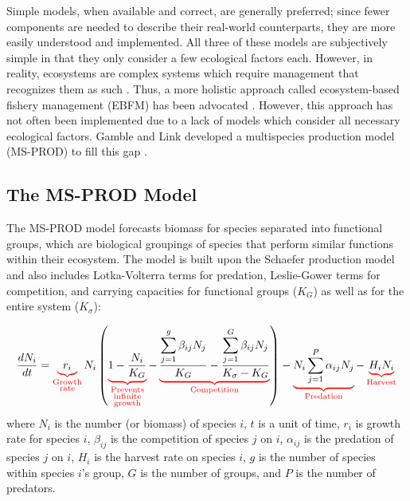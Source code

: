 Simple models, when available and correct, are generally preferred; since fewer components are needed to describe their real-world counterparts, they are more easily understood and implemented.  All three of these models are subjectively simple in that they only consider a few ecological factors each. However, in reality, ecosystems are complex systems which require management that recognizes them as such \cite{christensen1996}.  Thus, a more holistic approach called ecosystem-based fishery management (EBFM) has been advocated \cite{united1999}.  However, this approach has not often been implemented due to a lack of models which consider all necessary ecological factors.  Gamble and Link developed a multispecies production model (MS-PROD) to fill this gap \citeyearpar{gamble2009}.

\subsection{The MS-PROD Model}

The MS-PROD model forecasts biomass for species separated into functional groups, which are biological groupings of species that perform similar functions within their ecosystem.  The model is built upon the Schaefer production model and also includes Lotka-Volterra terms for predation, Leslie-Gower terms for competition, and carrying capacities for functional groups ($K_G$) as well as for the entire system ($K_{\sigma}$):

\begin{equation}
\frac{d N_i}{dt} = \redub{r_i}_{\substack{\text{Growth}\\\text{rate}}} N_i \left(\redub{1 - \frac{N_i}{K_G}}_{\substack{\text{Prevents}\\\text{infinite}\\\text{growth}}} - \redub{\frac{\displaystyle\sum\limits_{j=1}^g \beta_{ij} N_j}{K_G} - \frac{\displaystyle\sum\limits_{j=1}^G \beta_{ij} N_j}{K_{\sigma} - K_G}}_{\substack{\text{Competition}}} \right) - \redub{N_i \displaystyle\sum\limits_{j=1}^P \alpha_{ij} N_j}_{\substack{\text{Predation}}} - \redub{H_i N_i}_{\substack{\text{Harvest}}}
\end{equation}
where $N_i$ is the number (or biomass) of species $i$, $t$ is a unit of time, $r_i$ is growth rate for species $i$, $\beta_{ij}$ is the competition of species $j$ on $i$, $\alpha_{ij}$ is the predation of species $j$ on $i$, $H_i$ is the harvest rate on species $i$, $g$ is the number of species within species $i$'s group, $G$ is the number of groups, and $P$ is the number of predators.


